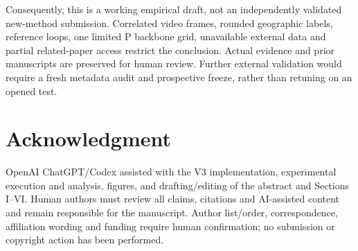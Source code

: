 \documentclass[conference]{IEEEtran}
\begin{document}
Consequently, this is a working empirical draft, not an independently validated new-method submission. Correlated video frames, rounded geographic labels, reference loops, one limited P backbone grid, unavailable external data and partial related-paper access restrict the conclusion. Actual evidence and prior manuscripts are preserved for human review. Further external validation would require a fresh metadata audit and prospective freeze, rather than retuning on an opened test.

\section*{Acknowledgment}
OpenAI ChatGPT/Codex assisted with the V3 implementation, experimental execution and analysis, figures, and drafting/editing of the abstract and Sections I--VI. Human authors must review all claims, citations and AI-assisted content and remain responsible for the manuscript. Author list/order, correspondence, affiliation wording and funding require human confirmation; no submission or copyright action has been performed.
\end{document}
